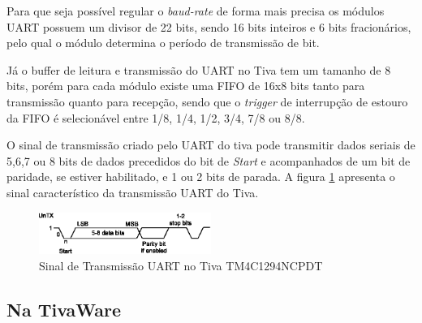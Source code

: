 Para que seja possível regular o \emph{baud-rate} de forma mais precisa os módulos UART possuem um divisor de 22 bits, sendo 16 bits inteiros e 6 bits fracionários, pelo qual o módulo determina o período de transmissão de bit.

Já o buffer de leitura e transmissão do UART no Tiva tem um tamanho de 8 bits, porém para cada módulo existe uma FIFO de 16x8 bits tanto para transmissão quanto para recepção, sendo que o \emph{trigger} de interrupção de estouro da FIFO é selecionável entre 1/8, 1/4, 1/2, 3/4, 7/8 ou 8/8. 

O sinal de transmissão criado pelo UART do tiva pode transmitir dados seriais de 5,6,7 ou 8 bits de dados precedidos do bit de \emph{Start} e acompanhados de um bit de paridade, se estiver habilitado, e 1 ou 2 bits de parada. A figura \ref{fig:uartTiva} apresenta o sinal característico da transmissão UART do Tiva. 

\begin{figure}[H]
	\centering
	\includegraphics[width=0.5\textwidth] {figuras/uartTiva.eps}
	\caption{Sinal de Transmissão UART no Tiva TM4C1294NCPDT}
	\label{fig:uartTiva}
\end{figure}


\subsection{Na TivaWare}

